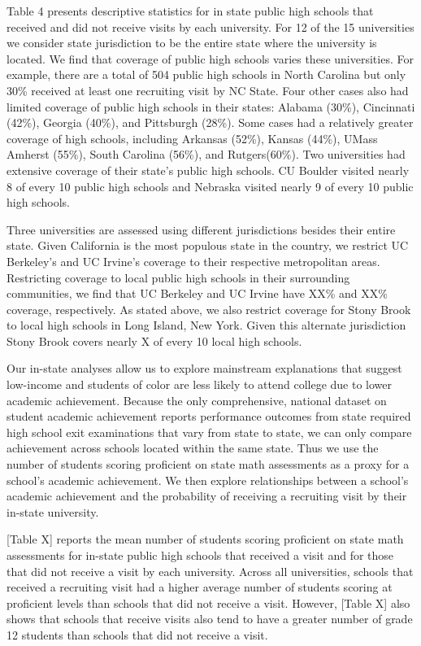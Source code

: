 \documentclass[twoside]{article}
\begin{document}
Table 4 presents descriptive statistics for in state public high schools that received and did not receive visits by each university. For 12 of the 15 universities we consider state jurisdiction to be the entire state where the university is located. We find that coverage of public high schools varies these universities. For example, there are a total of 504 public high schools in North Carolina but only 30\% received at least one recruiting visit by NC State.  Four other cases also had limited coverage of public high schools in their states: Alabama (30\%), Cincinnati (42\%), Georgia (40\%), and Pittsburgh (28\%). Some cases had a relatively greater coverage of high schools, including Arkansas (52\%), Kansas (44\%), UMass Amherst (55\%), South Carolina (56\%), and Rutgers(60\%). Two universities had extensive coverage of their state’s public high schools. CU Boulder visited nearly 8 of every 10 public high schools and Nebraska visited nearly 9 of every 10 public high schools. 

Three universities are assessed using different jurisdictions besides their entire state. Given California is the most populous state in the country, we restrict UC Berkeley's and UC Irvine's coverage to their respective metropolitan areas. Restricting coverage to local public high schools in their surrounding communities, we find that UC Berkeley and UC Irvine have XX\% and XX\% coverage, respectively. As stated above, we also restrict coverage for Stony Brook to local high schools in Long Island, New York. Given this alternate jurisdiction Stony Brook covers nearly X of every 10 local high schools.

Our in-state analyses allow us to explore mainstream explanations that suggest low-income and students of color are less likely to attend college due to lower academic achievement. Because the only comprehensive, national dataset on student academic achievement reports performance outcomes from state required high school exit examinations that vary from state to state, we can only compare achievement across schools located within the same state. Thus we use the number of students scoring proficient on state math assessments as a proxy for a school's academic achievement. We then explore relationships between a school's academic achievement and the probability of receiving a recruiting visit by their in-state university.  

[Table X] reports the mean number of students scoring proficient on state math assessments for in-state public high schools that received a visit and for those that did not receive a visit by each university. Across all universities, schools that received a recruiting visit had a higher average number of students scoring at proficient levels than schools that did not receive a visit. However, [Table X] also shows that schools that receive visits also tend to have a greater number of grade 12 students than schools that did not receive a visit.
\end{document}
